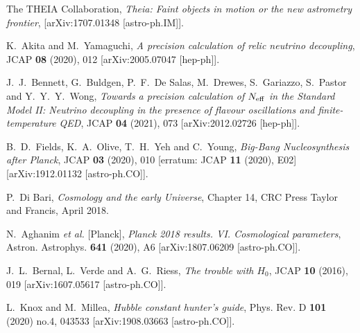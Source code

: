 \documentclass[a4paper,11pt]{article}
\begin{document}
\begin{thebibliography}{99}
The THEIA Collaboration, {\em Theia: Faint objects in motion or the new astrometry frontier}, 
[arXiv:1707.01348 [astro-ph.IM]].


K.~Akita and M.~Yamaguchi,
{\em A precision calculation of relic neutrino decoupling},
JCAP \textbf{08} (2020), 012
[arXiv:2005.07047 [hep-ph]].

J.~J.~Bennett, G.~Buldgen, P.~F.~De Salas, M.~Drewes, S.~Gariazzo, S.~Pastor and Y.~Y.~Y.~Wong,
{\em Towards a precision calculation of $N_{\rm eff}$ in the Standard Model II: Neutrino decoupling in the presence of flavour oscillations and finite-temperature QED}, 
JCAP \textbf{04} (2021), 073
[arXiv:2012.02726 [hep-ph]].


B.~D.~Fields, K.~A.~Olive, T.~H.~Yeh and C.~Young,
{\em Big-Bang Nucleosynthesis after Planck},
JCAP \textbf{03} (2020), 010
[erratum: JCAP \textbf{11} (2020), E02]
[arXiv:1912.01132 [astro-ph.CO]].


P.~Di Bari, {\em Cosmology and the early Universe}, Chapter 14, CRC Press Taylor and Francis, April 2018. 



N.~Aghanim \textit{et al.} [Planck], {\em Planck 2018 results. VI. Cosmological parameters},
Astron. Astrophys. \textbf{641} (2020), A6
[arXiv:1807.06209 [astro-ph.CO]].

J.~L.~Bernal, L.~Verde and A.~G.~Riess,
{\em The trouble with $H_0$},
JCAP \textbf{10} (2016), 019
[arXiv:1607.05617 [astro-ph.CO]].



L.~Knox and M.~Millea,
{\em Hubble constant hunter\textquoteright{}s guide},
Phys. Rev. D \textbf{101} (2020) no.4, 043533
[arXiv:1908.03663 [astro-ph.CO]].



\end{thebibliography}
\end{document}
